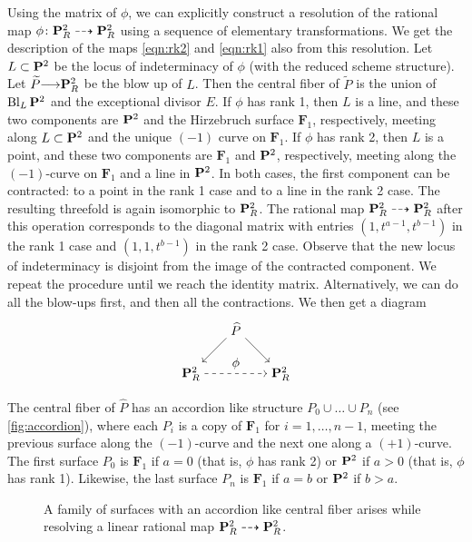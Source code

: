 \documentclass[11pt,reqno, letterpaper]{amsart}
\DeclareMathOperator{\Bl}{Bl}
\renewcommand{\to}{{\longrightarrow}}
\numberwithin{equation}{section}
\newcommand{\F}{\mathbf F}
\begin{document}
Using the matrix of $\phi$, we can explicitly construct a resolution of the rational map $\phi \colon \P^2_R \dashrightarrow \P^2_R$ using a sequence of elementary transformations.
We get the description of the maps \eqref{eqn:rk2} and \eqref{eqn:rk1} also from this resolution.
Let $L \subset \P^2$ be the locus of indeterminacy of $\phi$ (with the reduced scheme structure).
Let $\widetilde P \to \P^2_R$ be the blow up of $L$.
Then the central fiber of $\widetilde P$ is the union of $\Bl_L\P^2$ and the exceptional divisor $E$.
If $\phi$ has rank 1, then $L$ is a line, and these two components are $\P^2$ and the Hirzebruch surface $\F_1$, respectively, meeting along $L \subset \P^2$ and the unique $(-1)$ curve on $\F_1$.
If $\phi$ has rank 2, then $L$ is a point, and these two components are $\F_1$ and $\P^2$, respectively, meeting along the $(-1)$-curve on $\F_1$ and a line in $\P^2$.
In both cases, the first component can be contracted: to a point in the rank 1 case and to a line in the rank 2 case.
The resulting threefold is again isomorphic to $\P^2_R$.
The rational map $\P^2_R \dashrightarrow \P^2_R$ after this operation corresponds to the diagonal matrix with entries $(1,t^{a-1}, t^{b-1})$ in the rank 1 case and $(1, 1, t^{b-1})$ in the rank 2 case.
Observe that the new locus of indeterminacy is disjoint from the image of the contracted component.
We repeat the procedure until we reach the identity matrix.
Alternatively, we can do all the blow-ups first, and then all the contractions.
We then get a diagram
\[
\begin{tikzpicture}[node distance=5em]
  \node (t) {$\widehat P$};
  \node (l) [below left of=t] {$\P^2_R$};
  \node (r) [below right of=t] {$\P^2_R$};
  \path [->] (l) edge[dashed]  node[above] {$\phi$}  (r) (t) edge (l) (t) edge (r);
\end{tikzpicture}
\]
The central fiber of $\widehat P$ has an accordion like structure $P_0 \cup \dots \cup P_n$ (see \autoref{fig:accordion}), where each $P_i$ is a copy of $\F_1$ for $i = 1, \dots, n-1$, meeting the previous surface along the $(-1)$-curve and the next one along a $(+1)$-curve.
The first surface $P_0$ is $\F_1$ if $a = 0$ (that is, $\phi$ has rank 2) or $\P^2$ if $a > 0$ (that is, $\phi$ has rank 1).
Likewise, the last surface $P_n$ is $\F_1$ if $a = b$ or $\P^2$ if $b > a$.

\begin{figure}
  \centering
  
  \caption{A family of surfaces with an accordion like central fiber arises while resolving a linear rational map $\P^2_R \dashrightarrow \P^2_R$.}
  \label{fig:accordion}
\end{figure}
\end{document}
